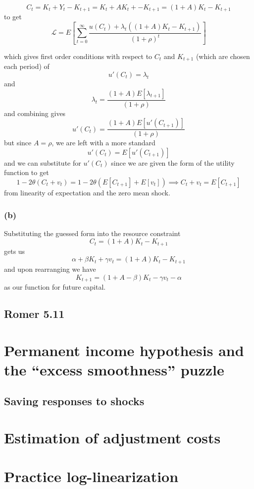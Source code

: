 \documentclass[11pt]{amsart}
\begin{document}
\[
C_t = K_t + Y_t - K_{t+1} =  K_t + A K_t + - K_{t+1}  = (1 + A) K_t - K_{t+1}
\]
to get
\[
\mathcal{L} = E \left[ \sum_{t=0}^{\infty} \frac{u(C_t) + \lambda_t ((1 + A) K_t - K_{t+1})}{(1+\rho)^t} \right]
\]

which gives first order conditions with respect to $C_t$ and $K_{t+1}$ (which are chosen each period) of 
\[
u'(C_t) = \lambda_t
\]
and
\[
\lambda_t = \frac{(1+A) E[\lambda_{t+1}]}{(1+\rho)}
\]
and combining gives
\[
u'(C_t) = \frac{(1+A) E[u'(C_{t+1})]}{(1+\rho)}
\]
but since $A=\rho$, we are left with a more standard
\[
u'(C_t) = E[u'(C_{t+1})]
\]
and we can substitute for $u'(C_t)$ since we are given the form of the utility function to get 
\[
1 - 2 \theta (C_t + v_t) = 1 - 2 \theta (E[C_{t+1}] + E[v_t]) \implies C_t + v_t = E[C_{t+1}] 
\]
from linearity of expectation and the zero mean shock.

\subsubsection*{(b)}

Substituting the guessed form into the resource constraint
\[
C_t = (1 + A) K_t - K_{t+1}
\]
gets us
\[
\alpha + \beta K_t + \gamma v_t = (1 + A) K_t - K_{t+1}
\]
and upon rearranging we have
\[
K_{t+1} = (1 + A - \beta) K_t - \gamma v_t - \alpha
\]
as our function for future capital.



\subsection{Romer 5.11}

\section{Permanent income hypothesis and the ``excess smoothness'' puzzle}

\subsection{Saving responses to shocks}

\section{Estimation of adjustment costs}

\section{Practice log-linearization}
\end{document}
